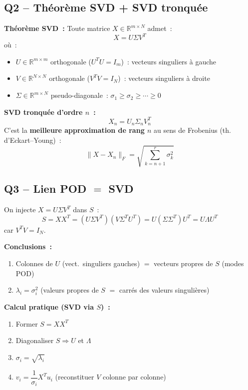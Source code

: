 \documentclass[11pt,a4paper]{article}
\begin{document}
\subsection{Q2 -- Th\'eor\`eme SVD + SVD tronqu\'ee}

\begin{formulabox}[Solution]
\textbf{Th\'eor\`eme SVD~:} Toute matrice $X \in \mathbb{R}^{m\times N}$ admet~:
\[
\boxed{X = U\Sigma V^T}
\]
o\`u~:
\begin{itemize}[nosep]
\item $U \in \mathbb{R}^{m\times m}$ orthogonale ($U^TU = I_m$)~: vecteurs singuliers \`a gauche
\item $V \in \mathbb{R}^{N\times N}$ orthogonale ($V^TV = I_N$)~: vecteurs singuliers \`a droite
\item $\Sigma \in \mathbb{R}^{m\times N}$ pseudo-diagonale~: $\sigma_1 \geq \sigma_2 \geq \cdots \geq 0$
\end{itemize}

\textbf{SVD tronqu\'ee d'ordre $n$~:}
\[
X_n = U_n\Sigma_n V_n^T
\]
C'est la \textbf{meilleure approximation de rang $n$} au sens de Frobenius (th. d'Eckart--Young)~:
\[
\|X - X_n\|_F = \sqrt{\sum_{k=n+1}^{r} \sigma_k^2}
\]
\end{formulabox}

\subsection{Q3 -- Lien POD $=$ SVD}

\begin{formulabox}
On injecte $X = U\Sigma V^T$ dans $S$~:
\[
S = XX^T = (U\Sigma V^T)(V\Sigma^T U^T) = U(\Sigma\Sigma^T)U^T = U\Lambda U^T
\]
car $V^TV = I_N$.

\medskip
\textbf{Conclusions~:}
\begin{enumerate}[nosep]
\item Colonnes de $U$ (vect.\ singuliers gauches) $=$ vecteurs propres de $S$ (modes POD)
\item $\boxed{\lambda_i = \sigma_i^2}$ \quad (valeurs propres de $S$ $=$ carr\'es des valeurs singuli\`eres)
\end{enumerate}

\textbf{Calcul pratique (SVD via $S$)~:}
\begin{enumerate}[nosep]
\item Former $S = XX^T$
\item Diagonaliser $S \Rightarrow U$ et $\Lambda$
\item $\sigma_i = \sqrt{\lambda_i}$
\item $v_i = \dfrac{1}{\sigma_i}X^Tu_i$ \quad (reconstituer $V$ colonne par colonne)
\end{enumerate}
\end{formulabox}
\end{document}
